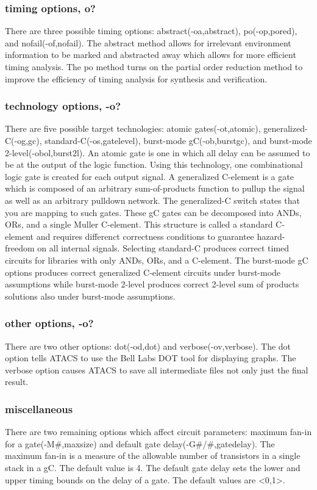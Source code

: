 \documentclass[titlepage,11pt]{article}
\begin{document}
  \subsubsection{timing options, o?}
  There are three possible timing options: abstract(-oa,abstract),
  po(-op,pored), and nofail(-of,nofail).  The abstract method allows
  for irrelevant environment information to be marked and abstracted
  away which allows for more efficient timing analysis.  The po method
  turns on the partial order reduction method to improve the
  efficiency of timing analysis for synthesis and verification.
  
  \subsubsection{technology options, -o?}
  There are five possible target technologies: atomic
  gates(-ot,atomic), generalized-C(-og,gc), standard-C(-os,gatelevel),
  burst-mode gC(-ob,burstgc), and burst-mode 2-level(-obol,burst2l).  An
  atomic gate is one in which all delay can be assumed to be at the
  output of the logic function.  Using this technology, one
  combinational logic gate is created for each output signal.  A
  generalized C-element is a gate which is composed of an arbitrary
  sum-of-products function to pullup the signal as well as an arbitrary
  pulldown network.  The generalized-C switch states that you are
  mapping to such gates.  These gC gates can be decomposed into ANDs,
  ORs, and a single Muller C-element.  This structure is called a
  standard C-element and requires differenct correctness conditions to
  guarantee hazard-freedom on all internal signals. Selecting standard-C
  produces correct timed circuits for libraries with only ANDs, ORs, and
  a C-element.  The burst-mode gC options produces correct generalized
  C-element circuits under burst-mode assumptions while burst-mode
  2-level produces correct 2-level sum of products solutions also under
  burst-mode assumptions.
  
  \subsubsection{other options, -o?}
  There are two other options: dot(-od,dot) and verbose(-ov,verbose).
  The dot option tells ATACS to use the Bell Labs DOT tool for
  displaying graphs.  The verbose option causes ATACS to save all
  intermediate files not only just the final result.
  
  \subsubsection{miscellaneous}
  There are two remaining options which affect circuit parameters:
  maximum fan-in for a gate(-M\#,maxsize) and default gate
  delay(-G\#/\#,gatedelay).  The maximum fan-in is a measure of the
  allowable number of transistors in a single stack in a gC.  The
  default value is 4.  The default gate delay sets the lower and upper
  timing bounds on the delay of a gate.  The default values are <0,1>.
  
\end{document}
